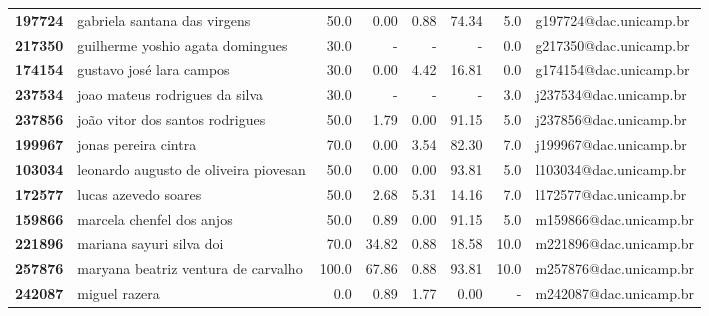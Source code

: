 \documentclass[11pt]{article}
\begin{document}
\begin{center}
\begin{landscape}
\begin{longtable}{llrrrrrl}
\textbf{197724} &           gabriela santana das virgens &                  50.0 &        0.00 &        0.88 &       74.34 &                      5.0 &  g197724@dac.unicamp.br \\
\textbf{217350} &       guilherme yoshio agata domingues &                  30.0 &           - &           - &           - &                      0.0 &  g217350@dac.unicamp.br \\
\textbf{174154} &               gustavo josé lara campos &                  30.0 &        0.00 &        4.42 &       16.81 &                      0.0 &  g174154@dac.unicamp.br \\
\textbf{237534} &         joao mateus rodrigues da silva &                  30.0 &           - &           - &           - &                      3.0 &  j237534@dac.unicamp.br \\
\textbf{237856} &        joão vitor dos santos rodrigues &                  50.0 &        1.79 &        0.00 &       91.15 &                      5.0 &  j237856@dac.unicamp.br \\
\textbf{199967} &                   jonas pereira cintra &                  70.0 &        0.00 &        3.54 &       82.30 &                      7.0 &  j199967@dac.unicamp.br \\
\textbf{103034} &  leonardo augusto de oliveira piovesan &                  50.0 &        0.00 &        0.00 &       93.81 &                      5.0 &  l103034@dac.unicamp.br \\
\textbf{172577} &                   lucas azevedo soares &                  50.0 &        2.68 &        5.31 &       14.16 &                      7.0 &  l172577@dac.unicamp.br \\
\textbf{159866} &              marcela chenfel dos anjos &                  50.0 &        0.89 &        0.00 &       91.15 &                      5.0 &  m159866@dac.unicamp.br \\
\textbf{221896} &               mariana sayuri silva doi &                  70.0 &       34.82 &        0.88 &       18.58 &                     10.0 &  m221896@dac.unicamp.br \\
\textbf{257876} &    maryana beatriz ventura de carvalho &                 100.0 &       67.86 &        0.88 &       93.81 &                     10.0 &  m257876@dac.unicamp.br \\
\textbf{242087} &                          miguel razera &                   0.0 &        0.89 &        1.77 &        0.00 &                        - &  m242087@dac.unicamp.br \\

\end{longtable}
\end{landscape}
\end{center}
\end{document}
